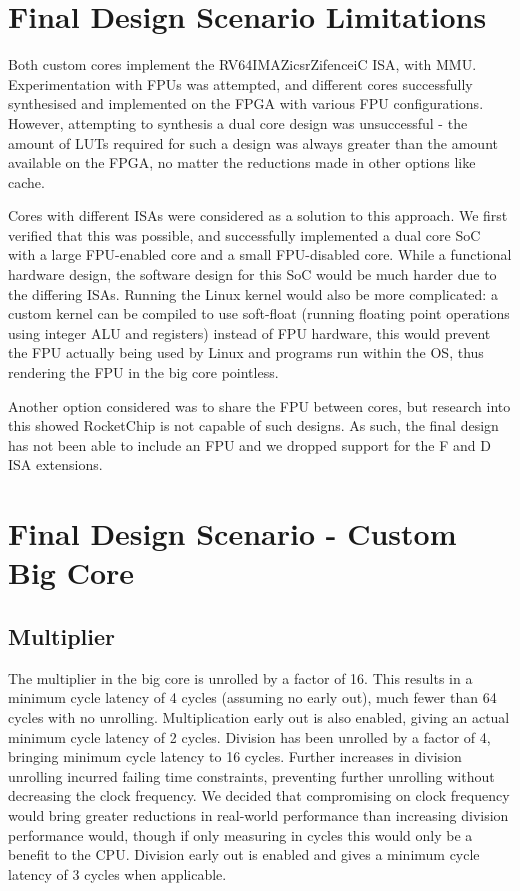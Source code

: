 \section{Final Design Scenario Limitations}
Both custom cores implement the RV64IMAZicsrZifenceiC ISA, with MMU. Experimentation with FPUs was attempted, and different cores successfully synthesised and implemented on the FPGA with various FPU configurations. However, attempting to synthesis a dual core design was unsuccessful - the amount of LUTs required for such a design was always greater than the amount available on the FPGA, no matter the reductions made in other options like cache.

Cores with different ISAs were considered as a solution to this approach. We first verified that this was possible, and successfully implemented a dual core SoC with a large FPU-enabled core and a small FPU-disabled core. While a functional hardware design, the software design for this SoC would be much harder due to the differing ISAs. Running the Linux kernel would also be more complicated: a custom kernel can be compiled to use soft-float (running floating point operations using integer ALU and registers) instead of FPU hardware, this would prevent the FPU actually being used by Linux and programs run within the OS, thus rendering the FPU in the big core pointless.

Another option considered was to share the FPU between cores, but research into this showed RocketChip is not capable of such designs. As such, the final design has not been able to include an FPU and we dropped support for the F and D ISA extensions.


\section{Final Design Scenario - Custom Big Core}
\subsection{Multiplier} %
The multiplier in the big core is unrolled by a factor of 16. This results in a minimum cycle latency of 4 cycles (assuming no early out), much fewer than 64 cycles with no unrolling. Multiplication early out is also enabled, giving an actual minimum cycle latency of 2 cycles.
Division has been unrolled by a factor of 4, bringing minimum cycle latency to 16 cycles. Further increases in division unrolling incurred failing time constraints, preventing further unrolling without decreasing the clock frequency. We decided that compromising on clock frequency would bring greater reductions in real-world performance than increasing division performance would, though if only measuring in cycles this would only be a benefit to the CPU. Division early out is enabled and gives a minimum cycle latency of 3 cycles when applicable.

